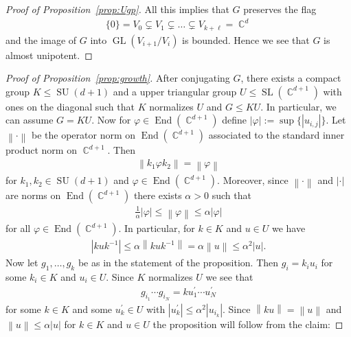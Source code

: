 \documentclass[12pt]{amsart}
\theoremstyle{plain}
\theoremstyle{definition}
\theoremstyle{remark}
\begin{document}
\begin{proof}[Proof of Proposition~\ref{prop:Ugp}]
All this implies that $G$ preserves the flag
\begin{align*}
\{0\}=V_0 \subsetneq V_1\subsetneq \dots \subsetneq V_{k+\ell}=\operatorname{\mathbb{C}}^d
\end{align*}
and the image of  $G$ into $\operatorname{GL}(V_{i+1}/V_i)$ is bounded. Hence we see that $G$ is almost unipotent.
\end{proof}

\begin{proof}[Proof of Proposition~\ref{prop:growth}]
After conjugating $G$, there exists a compact group $K \leq \operatorname{SU}(d+1)$ and a upper triangular group $U \leq \operatorname{SL}(\operatorname{\mathbb{C}}^{d+1})$ with ones on the diagonal such that $K$ normalizes $U$ and $G \leq KU$. In particular, we can assume $G=KU$. Now for $\varphi \in \operatorname{End}(\operatorname{\mathbb{C}}^{d+1})$ define ${\left|{\varphi}\right|} := \sup\{ {\left|{u_{i,j}}\right|} \}$. Let ${\left\|{\cdot}\right\|}$ be the operator norm on $\operatorname{End}(\operatorname{\mathbb{C}}^{d+1})$ associated to the standard inner product norm on $\operatorname{\mathbb{C}}^{d+1}$. Then 
\begin{align*}
{\left\|{k_1 \varphi k_2 }\right\|} = {\left\|{\varphi}\right\|}
\end{align*}
for $k_1,k_2 \in \operatorname{SU}(d+1)$ and $\varphi \in \operatorname{End}(\operatorname{\mathbb{C}}^{d+1})$. Moreover, since ${\left\|{\cdot}\right\|}$ and ${\left|{\cdot}\right|}$ are norms on $\operatorname{End}(\operatorname{\mathbb{C}}^{d+1})$ there exists $\alpha >0$ such that 
\begin{align*}
\frac{1}{\alpha}{\left|{ \varphi }\right|} \leq {\left\|{\varphi}\right\|} \leq \alpha {\left|{\varphi}\right|}
\end{align*}
for all $\varphi \in \operatorname{End}(\operatorname{\mathbb{C}}^{d+1})$. In particular, for $k \in K$ and $u \in U$ we have 
\begin{align*}
{\left|{kuk^{-1}}\right|} \leq \alpha {\left\|{kuk^{-1}}\right\|} = \alpha{\left\|{u}\right\|} \leq \alpha^2 {\left|{u}\right|}.
\end{align*} 
Now let $g_1, \dots, g_k$ be as in the statement of the proposition. Then $g_i = k_iu_i$ for some $k_i \in K$ and $u_i \in U$. Since $K$ normalizes $U$ we see that
\begin{align*}
g_{i_1} \cdots g_{i_N} = k u_1^\prime \cdots u_N^\prime
\end{align*}
for some $k \in K$ and some $u_k^\prime \in U$ with ${\left|{u_k^\prime}\right|} \leq \alpha^2 {\left|{u_{i_k}}\right|}$. Since ${\left\|{ku}\right\|} = {\left\|{u}\right\|}$ and  ${\left\|{u}\right\|} \leq \alpha {\left|{u}\right|}$ for $k \in K$ and $u \in U$ the proposition will follow from the claim:\newline


\end{proof}
\end{document}
